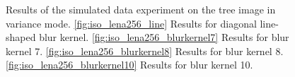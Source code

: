 \documentclass[12pt,notitlepage]{report}
\begin{document}
\clearpage

\begin{figure}[htb]
  \centering

  \caption[Results for the tree image in variance mode]{Results of the simulated data experiment on the tree image in variance mode. \ref{fig:iso_lena256_line} Results for diagonal line-shaped blur kernel. \ref{fig:iso_lena256_blurkernel7} Results for blur kernel 7. \ref{fig:iso_lena256_blurkernel8} Results for blur kernel 8. \ref{fig:iso_lena256_blurkernel10} Results for blur kernel 10.}
  \label{fig:var_tree256}
\end{figure}
\end{document}

